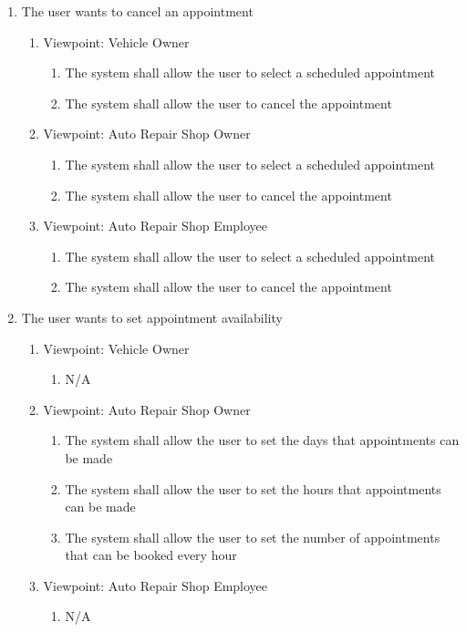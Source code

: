 \documentclass[12pt]{article}
\begin{document}
\begin{enumerate}[resume*=business_events]
	\item The user wants to cancel an appointment
	      \begin{enumerate}[VP\arabic*.]
		      \item Viewpoint: Vehicle Owner
		            \begin{enumerate}
			            \item The system shall allow the user to select a scheduled appointment
			            \item The system shall allow the user to cancel the appointment
		            \end{enumerate}
		      \item Viewpoint: Auto Repair Shop Owner
		            \begin{enumerate}
			            \item The system shall allow the user to select a scheduled appointment
			            \item The system shall allow the user to cancel the appointment
		            \end{enumerate}
		      \item Viewpoint: Auto Repair Shop Employee
		            \begin{enumerate}
			            \item The system shall allow the user to select a scheduled appointment
			            \item The system shall allow the user to cancel the appointment
		            \end{enumerate}
	      \end{enumerate}

	\item The user wants to set appointment availability
	      \begin{enumerate}[VP\arabic*.]
		      \item Viewpoint: Vehicle Owner
		            \begin{enumerate}
			            \item[] N/A
		            \end{enumerate}
		      \item Viewpoint: Auto Repair Shop Owner
		            \begin{enumerate}
			            \item The system shall allow the user to set the days that appointments can be made
			            \item The system shall allow the user to set the hours that appointments can be made
			            \item The system shall allow the user to set the number of appointments that can be booked every hour
		            \end{enumerate}
		      \item Viewpoint: Auto Repair Shop Employee
		            \begin{enumerate}
			            \item[] N/A
		            \end{enumerate}
	      \end{enumerate}
\end{enumerate}
\end{document}
